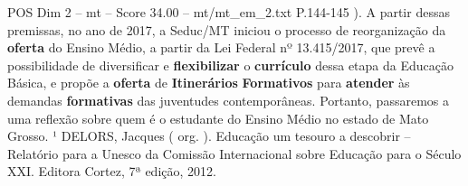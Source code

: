 \begin{textsample}{POS Dim 2 – mt – Score 34.00 – mt/mt\_em\_2.txt}
P.144-145 ).
A partir dessas premissas, no ano de 2017, a Seduc/MT iniciou o processo de reorganização da \textbf{oferta} do Ensino Médio, a partir da Lei Federal nº 13.415/2017, que prevê a possibilidade de diversificar e \textbf{flexibilizar} o \textbf{currículo} dessa etapa da Educação Básica, e propõe a \textbf{oferta} de \textbf{Itinerários} \textbf{Formativos} para \textbf{atender} às demandas \textbf{formativas} das juventudes contemporâneas.
Portanto, passaremos a uma reflexão sobre quem é o estudante do Ensino Médio no estado de Mato Grosso. ¹ DELORS, Jacques ( org. ).
Educação um tesouro a descobrir – Relatório para a Unesco da Comissão Internacional sobre Educação para o Século XXI.
Editora Cortez, 7ª edição, 2012.

\end{textsample}
